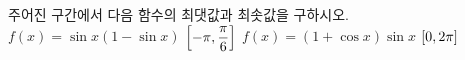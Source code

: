 주어진 구간에서 다음 함수의 최댓값과 최솟값을 구하시오.
 $f(x)=\sin x(1-\sin x)$ $\left[-\pi{,}\mkern3mu\mathopen{}\dfrac{\pi}{6}\right]$
 $f(x)=(1+\cos x)\sin x$ $[0{,}\mkern3mu\mathopen{}2\pi]$
